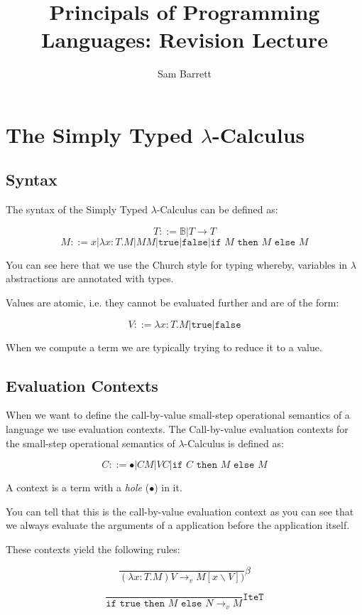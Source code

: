 \documentclass{article}
\title{Principals of Programming Languages: Revision Lecture}
\author{Sam Barrett}
\newcommand{\rarr}{\rightarrow}
\begin{document}
\maketitle

\section{The Simply Typed $\lambda$-Calculus}
\subsection{Syntax}
The syntax of the Simply Typed $\lambda$-Calculus can be defined as:

$$
T ::= \mathbb{B} | T \rightarrow T 
$$
$$
M ::= x | \lambda x: T.M | M M | \texttt{true} | \texttt{false} | \texttt{if } M \texttt{ then } M \texttt{ else } M
$$

You can see here that we use the Church style for typing whereby, variables in $\lambda$ abstractions are annotated with types.

Values are atomic, i.e. they cannot be evaluated further and are of the form:

$$
V ::= \lambda x: T.M | \texttt{true} | \texttt{false}
$$

When we compute a term we are typically trying to reduce it to a value.

\subsection{Evaluation Contexts}
When we want to define the call-by-value small-step operational semantics of a language we use evaluation contexts. The Call-by-value evaluation contexts for the small-step operational semantics of $\lambda$-Calculus is defined as:

$$
C ::= \bullet | C M | V C | \texttt{if } C \texttt{ then } M \texttt{ else } M 
$$

A context is a term with a \textit{hole} ($\bullet$) in it. 

You can tell that this is the call-by-value evaluation context as you can see that we always evaluate the arguments of a application before the application itself.

These contexts yield the following rules:

$$
\frac{}{( \lambda x: T. M) V \rarr_v M[x\backslash V])}\beta
$$

$$
\frac{}{ \texttt{if true}  \texttt{ then } M \texttt{ else } N \rarr_v M } \texttt{IteT}
$$
\end{document}
